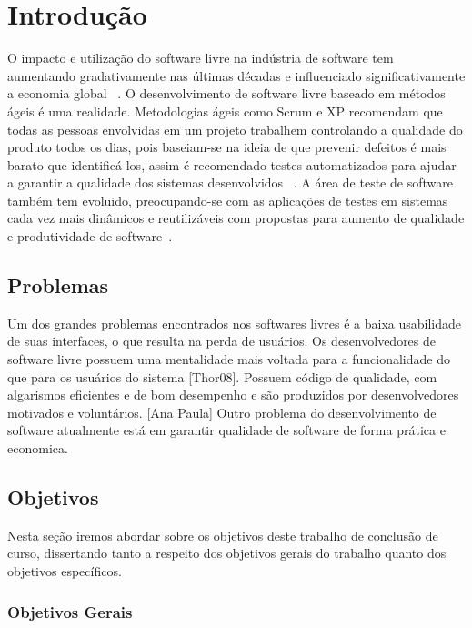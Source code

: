 	\chapter{Introdução}

	O impacto e utilização do software livre na indústria de software tem aumentando gradativamente nas últimas décadas e influenciado significativamente a economia global ~\cite{benkler2006}. 
	O desenvolvimento de software livre baseado em métodos ágeis é uma realidade. Metodologias ágeis como Scrum e XP recomendam que todas as pessoas envolvidas em um projeto trabalhem controlando a qualidade do produto todos os dias, pois baseiam-se na ideia de que prevenir defeitos é mais barato que identificá-los, assim é recomendado testes automatizados para ajudar a garantir a qualidade dos sistemas desenvolvidos ~\cite{bernardo2011}.
	A área de teste de software também tem evoluido, preocupando-se com as aplicações de testes	em sistemas cada vez mais dinâmicos e reutilizáveis com propostas para aumento de qualidade e produtividade de software~\cite{vicente2010}.
	\section{Problemas}

	Um dos grandes problemas encontrados nos softwares livres é a baixa usabilidade de suas interfaces, o que resulta na perda de usuários. 
	Os desenvolvedores de software livre possuem uma mentalidade mais voltada para a funcionalidade do que para os usuários do sistema [Thor08]. Possuem código de qualidade, com algarismos eficientes e de bom desempenho e são produzidos por desenvolvedores motivados e voluntários. [Ana Paula] 
	Outro problema do desenvolvimento de software atualmente está em garantir qualidade de software de 
	forma prática e economica.

	\section{Objetivos}

	Nesta seção iremos abordar sobre os objetivos deste trabalho de conclusão de curso, dissertando tanto a respeito dos objetivos gerais do trabalho quanto dos objetivos específicos.

	\subsection{Objetivos Gerais}
	 
